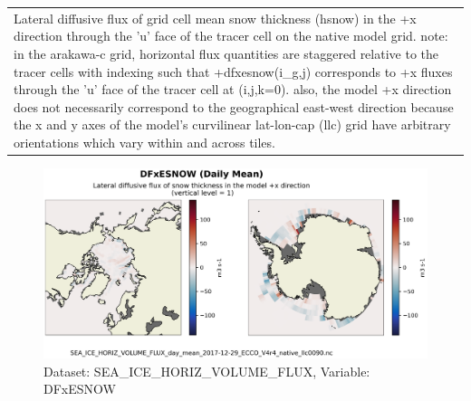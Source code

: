 \begin{longtable}{|m{}|m{}|m{}|m{}|}
\rowcolor{lightgray} \multicolumn{4}{|c|}{\textbf{Comments}} \\ \hline
\multicolumn{4}{|p{1\textwidth}|}{\footnotesize{{Lateral diffusive flux of grid cell mean snow thickness (hsnow) in the +x direction through the 'u' face of the tracer cell on the native model grid. note: in the arakawa-c grid, horizontal flux quantities are staggered relative to the tracer cells with indexing such that +dfxesnow(i\_g,j) corresponds to +x fluxes through the 'u' face of the tracer cell at (i,j,k=0). also, the model +x direction does not necessarily correspond to the geographical east-west direction because the x and y axes of the model's curvilinear lat-lon-cap (llc) grid have arbitrary orientations which vary within and across tiles.}}} \\ \hline
\end{longtable}

\begin{figure}[H]
\centering
\includegraphics[scale=0.55]{../images/plots/v4r4/native_plots/Sea-Ice_and_Snow_Horizontal_Volume_Fluxes/DFxESNOW.png}
\caption{Dataset: SEA\_ICE\_HORIZ\_VOLUME\_FLUX, Variable: DFxESNOW}
\label{tab:table-SEA_ICE_HORIZ_VOLUME_FLUX_DFxESNOW-Plot}
\end{figure}
\newpage
\pagebreak
